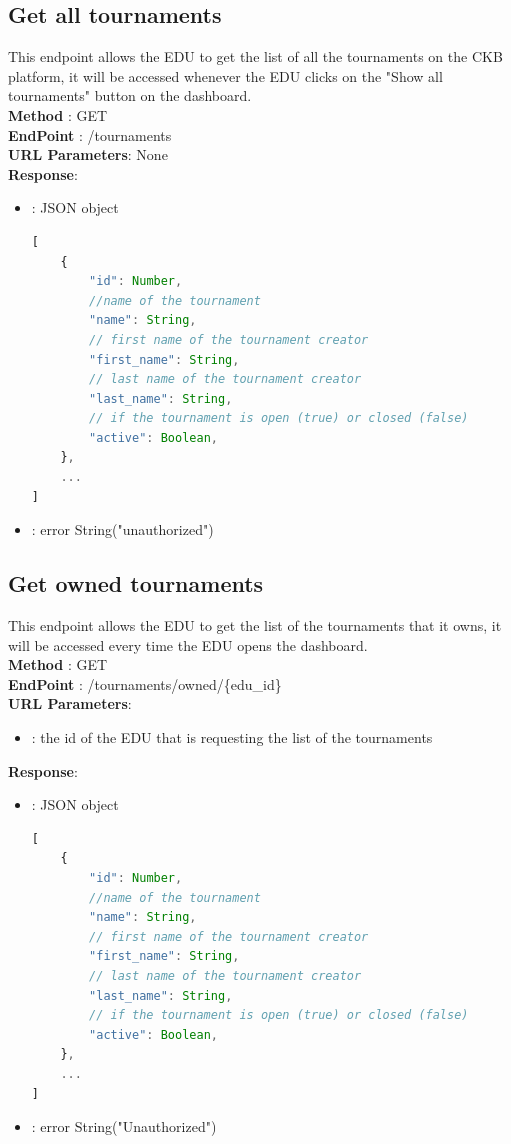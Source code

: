 \subsection*{Get all tournaments}
This endpoint allows the EDU to get the list of all the tournaments on the CKB platform, it will be accessed whenever the EDU clicks on the "Show all tournaments" button on the dashboard.\\
\textbf{Method} : GET \\
\textbf{EndPoint} : /tournaments \\
\textbf{URL Parameters}: None \\
\textbf{Response}:
\begin{itemize}
    \item {} : JSON object
          \begin{lstlisting}[language=JavaScript, label={lst:jscode}, basicstyle=\ttfamily]
[
    {
        "id": Number,
        //name of the tournament
        "name": String,
        // first name of the tournament creator
        "first_name": String, 
        // last name of the tournament creator
        "last_name": String,
        // if the tournament is open (true) or closed (false)
        "active": Boolean,
    },
    ...
]
        \end{lstlisting}
    \item {}: error String("unauthorized")
\end{itemize}

\subsection*{Get owned tournaments}
This endpoint allows the EDU to get the list of the tournaments that it owns, it will be accessed every time the EDU opens the dashboard.\\
\textbf{Method} : GET \\
\textbf{EndPoint} : /tournaments/owned/\{edu\_id\} \\
\textbf{URL Parameters}:
\begin{itemize}
    \item {}: the id of the EDU that is requesting the list of the tournaments
\end{itemize}
\textbf{Response}:
\begin{itemize}
    \item {} : JSON object
          \begin{lstlisting}[language=JavaScript, label={lst:jscode}, basicstyle=\ttfamily]
[
    {
        "id": Number,
        //name of the tournament
        "name": String,
        // first name of the tournament creator
        "first_name": String, 
        // last name of the tournament creator
        "last_name": String,
        // if the tournament is open (true) or closed (false)
        "active": Boolean,
    },
    ...
]
            \end{lstlisting}
    \item {} : error String("Unauthorized")
\end{itemize}

